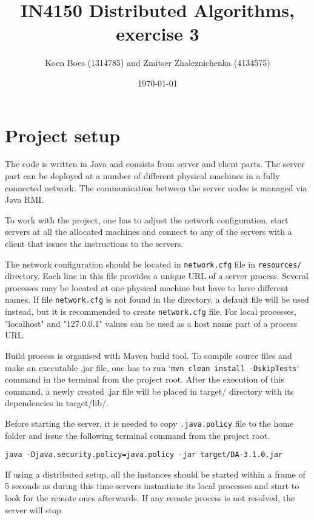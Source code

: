 \documentclass[a4paper, notitlepage]{article}
\begin{document}
\title{IN4150 Distributed Algorithms, exercise 3}
\author{Koen Boes (1314785) and Zmitser Zhaleznichenka (4134575)}
\date{\today}
\maketitle

\section{Project setup}

The code is written in Java and consists from server and client parts. The server part can be deployed at a number of different physical machines in a fully connected network. The communication between the server nodes is managed via Java RMI.

To work with the project, one has to adjust the network configuration, start servers at all the allocated machines and connect to any of the servers with a client that issues the instructions to the servers.

The network configuration should be located in \lstinline{network.cfg} file in \lstinline{resources/} directory. Each line in this file provides a unique URL of a server process. Several processes may be located at one physical machine but have to have different names. If file \lstinline{network.cfg} is not found in the directory, a default file will be used instead, but it is recommended to create \lstinline{network.cfg} file. For local processes, "localhost" and "127.0.0.1" values can be used as a host name part of a process URL.

Build process is organised with Maven build tool. To compile source files and make an executable .jar file, one has to run `\lstinline{mvn clean install -DskipTests}` command in the terminal from the project root. After the execution of this command, a newly created .jar file will be placed in target/ directory with its dependencies in target/lib/.

Before starting the server, it is needed to copy \lstinline{.java.policy} file to the home folder and issue the following terminal command from the project root.

\begin{center}
\lstinline{java -Djava.security.policy=java.policy -jar target/DA-3.1.0.jar}
\end{center}

If using a distributed setup, all the instances should be started within a frame of 5 seconds as during this time servers instantiate its local processes and start to look for the remote ones afterwards. If any remote process is not resolved, the server will stop.
\end{document}
